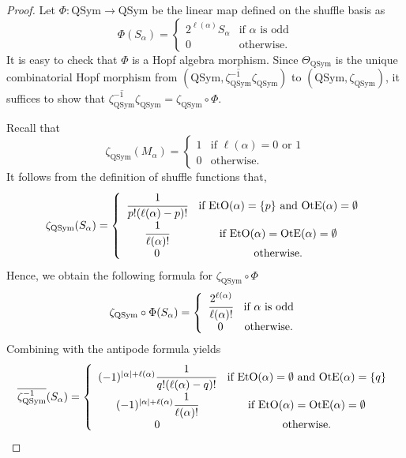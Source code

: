 \documentclass[10pt,a4paper]{amsart}
\newcommand{\EtO}{\mathrm{EtO}}
\newcommand{\OtE}{\mathrm{OtE}}
\newcommand{\QSym}{\mathrm{QSym}}
\begin{document}
\begin{proof}
	Let $\Phi:\QSym\to\QSym$ be the linear map defined on the shuffle basis as
	$$\Phi(S_\alpha)=\left\{\begin{array}{cc}
	2^{\ell(\alpha)}S_\alpha & \text{if }\alpha \text{ is odd}\\
	0& \text{otherwise.}
	\end{array}\right.$$
	It is easy to check that $\Phi$ is a Hopf algebra morphism.
	Since $\Theta_\QSym$ is the unique combinatorial Hopf morphism from $(\QSym,\overline{\zeta_\QSym^{-1}}\zeta_\QSym)$ to $(\QSym,\zeta_\QSym)$, it suffices to show that $\overline{\zeta_\QSym^{-1}}\zeta_\QSym=\zeta_\QSym\circ\Phi$.
	
	Recall that
	$$\zeta_\QSym(M_\alpha)=\left\{\begin{array}{cc}
	1 & \text{if }\ell(\alpha)=0\text{ or }1\\
	0 & \text{otherwise}.
	\end{array}\right.$$
	It follows from the definition of shuffle functions that,
	\begin{equation}\label{eq:3.1}
		\zeta_\QSym(S_\alpha)=\left\{\begin{array}{cc}
			\cfrac{1}{p!(\ell(\alpha)-p)!} & \text{if }\EtO(\alpha)=\{p\}\text{ and }\OtE(\alpha)=\emptyset\\
			\cfrac{1}{\ell(\alpha)!} & \text{if }\EtO(\alpha)=\OtE(\alpha)=\emptyset\\
			0 & \text{otherwise}.
		\end{array}\right.
	\end{equation}
	Hence, we obtain the following formula for $\zeta_\QSym\circ\Phi$
	$$\zeta_\QSym\circ\Phi(S_\alpha)=\left\{\begin{array}{cc}
	\cfrac{2^{\ell(\alpha)}}{\ell(\alpha)!}& \text{if }\alpha\text{ is odd}\\
	0 & \text{otherwise.}
	\end{array}\right.$$
	Combining with the antipode formula yields
	\begin{equation}\label{eq:3.2}
		\overline{\zeta_\QSym^{-1}}(S_\alpha)=\left\{\begin{array}{cc}
			(-1)^{|\alpha|+\ell(\alpha)}\cfrac{1}{q!(\ell(\alpha)-q)!} & \text{if }\EtO(\alpha)=\emptyset\text{ and }\OtE(\alpha)=\{q\}\\
			(-1)^{|\alpha|+\ell(\alpha)}\cfrac{1}{\ell(\alpha)!} & \text{if }\EtO(\alpha)=\OtE(\alpha)=\emptyset\\
			0 & \text{otherwise}.
		\end{array}\right.

\end{equation}
\end{proof}
\end{document}
